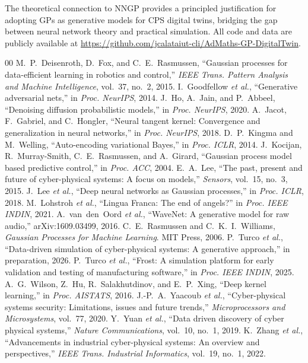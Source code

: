 \documentclass[conference]{IEEEtran}
\begin{document}
The theoretical connection to NNGP provides a principled justification for adopting GPs as generative models for CPS digital twins, bridging the gap between neural network theory and practical simulation. All code and data are publicly available at \url{https://github.com/jcalataiut-cli/AdMaths-GP-DigitalTwin}.

\begin{thebibliography}{00}
 M.~P.~Deisenroth, D.~Fox, and C.~E.~Rasmussen, ``Gaussian processes for data-efficient learning in robotics and control,'' \textit{IEEE Trans. Pattern Analysis and Machine Intelligence}, vol.~37, no.~2, 2015.
 I.~Goodfellow \textit{et al.}, ``Generative adversarial nets,'' in \textit{Proc. NeurIPS}, 2014.
 J.~Ho, A.~Jain, and P.~Abbeel, ``Denoising diffusion probabilistic models,'' in \textit{Proc. NeurIPS}, 2020.
 A.~Jacot, F.~Gabriel, and C.~Hongler, ``Neural tangent kernel: Convergence and generalization in neural networks,'' in \textit{Proc. NeurIPS}, 2018.
 D.~P.~Kingma and M.~Welling, ``Auto-encoding variational Bayes,'' in \textit{Proc. ICLR}, 2014.
 J.~Kocijan, R.~Murray-Smith, C.~E.~Rasmussen, and A.~Girard, ``Gaussian process model based predictive control,'' in \textit{Proc. ACC}, 2004.
 E.~A.~Lee, ``The past, present and future of cyber-physical systems: A focus on models,'' \textit{Sensors}, vol.~15, no.~3, 2015.
 J.~Lee \textit{et al.}, ``Deep neural networks as Gaussian processes,'' in \textit{Proc. ICLR}, 2018.
 M.~Lohstroh \textit{et al.}, ``Lingua Franca: The end of angels?'' in \textit{Proc. IEEE INDIN}, 2021.
 A.~van~den~Oord \textit{et al.}, ``WaveNet: A generative model for raw audio,'' arXiv:1609.03499, 2016.
 C.~E.~Rasmussen and C.~K.~I.~Williams, \textit{Gaussian Processes for Machine Learning}. MIT Press, 2006.
 P.~Turco \textit{et al.}, ``Data-driven simulation of cyber-physical systems: A generative approach,'' in preparation, 2026.
 P.~Turco \textit{et al.}, ``Frost: A simulation platform for early validation and testing of manufacturing software,'' in \textit{Proc. IEEE INDIN}, 2025.
 A.~G.~Wilson, Z.~Hu, R.~Salakhutdinov, and E.~P.~Xing, ``Deep kernel learning,'' in \textit{Proc. AISTATS}, 2016.
 J.-P.~A.~Yaacoub \textit{et al.}, ``Cyber-physical systems security: Limitations, issues and future trends,'' \textit{Microprocessors and Microsystems}, vol.~77, 2020.
 Y.~Yuan \textit{et al.}, ``Data driven discovery of cyber physical systems,'' \textit{Nature Communications}, vol.~10, no.~1, 2019.
 K.~Zhang \textit{et al.}, ``Advancements in industrial cyber-physical systems: An overview and perspectives,'' \textit{IEEE Trans. Industrial Informatics}, vol.~19, no.~1, 2022.
\end{thebibliography}
\end{document}
